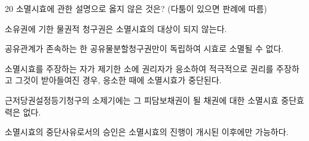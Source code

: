 \begin{question}{20}
소멸시효에 관한 설명으로 옳지 않은 것은? (다툼이 있으면 판례에 따름)
\begin{choices}
  \item 소유권에 기한 물권적 청구권은 소멸시효의 대상이 되지 않는다.
  \item 공유관계가 존속하는 한 공유물분할청구권만이 독립하여 시효로 소멸될 수 없다.
  \item 소멸시효를 주장하는 자가 제기한 소에 권리자가 응소하여 적극적으로 권리를 주장하고 그것이 받아들여진 경우, 응소한 때에 소멸시효가 중단된다.
  \item 근저당권설정등기청구의 소제기에는 그 피담보채권이 될 채권에 대한 소멸시효 중단효력은 없다.
  \item 소멸시효의 중단사유로서의 승인은 소멸시효의 진행이 개시된 이후에만 가능하다.
\end{choices}
\end{question}
